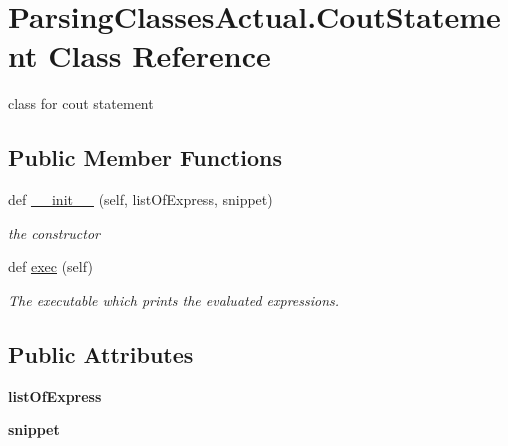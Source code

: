 \hypertarget{class_parsing_classes_actual_1_1_cout_statement}{}\section{Parsing\+Classes\+Actual.\+Cout\+Statement Class Reference}
\label{class_parsing_classes_actual_1_1_cout_statement}


class for cout statement  


\subsection*{Public Member Functions}
\begin{DoxyCompactItemize}
\item 
def \hyperlink{class_parsing_classes_actual_1_1_cout_statement_a0e4930ecbd6e69aac9830659965c4c9c}{\+\_\+\+\_\+init\+\_\+\+\_\+} (self, list\+Of\+Express, snippet)
\begin{DoxyCompactList}\small\item\em the constructor \end{DoxyCompactList}\item 
\mbox{\label{class_parsing_classes_actual_1_1_cout_statement_ad0afd27df037b3f14e777a1f3fa4173e}} 
def \hyperlink{class_parsing_classes_actual_1_1_cout_statement_ad0afd27df037b3f14e777a1f3fa4173e}{exec} (self)
\begin{DoxyCompactList}\small\item\em The executable which prints the evaluated expressions. \end{DoxyCompactList}\end{DoxyCompactItemize}
\subsection*{Public Attributes}
\begin{DoxyCompactItemize}
\item 
\mbox{\label{class_parsing_classes_actual_1_1_cout_statement_a7d1d563940af735f9155788a3806edeb}} 
{\bfseries list\+Of\+Express}
\item 
\mbox{\label{class_parsing_classes_actual_1_1_cout_statement_a6cbedbd0181ff15b696b8a8a6c9e4ef2}} 
{\bfseries snippet}
\end{DoxyCompactItemize}


